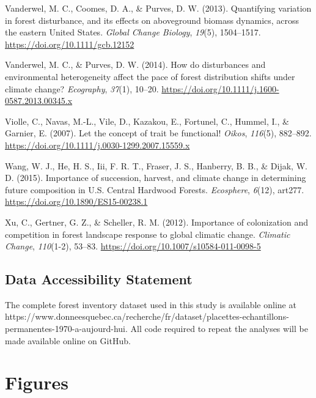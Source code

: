 \documentclass[
  a4paperpaper,
]{article}
\begin{document}
\leavevmode\hypertarget{ref-vanderwel_quantifying_2013}{}%
Vanderwel, M. C., Coomes, D. A., \& Purves, D. W. (2013). Quantifying
variation in forest disturbance, and its effects on aboveground biomass
dynamics, across the eastern United States. \emph{Global Change
Biology}, \emph{19}(5), 1504--1517.
\url{https://doi.org/10.1111/gcb.12152}

\leavevmode\hypertarget{ref-vanderwel_how_2014}{}%
Vanderwel, M. C., \& Purves, D. W. (2014). How do disturbances and
environmental heterogeneity affect the pace of forest distribution
shifts under climate change? \emph{Ecography}, \emph{37}(1), 10--20.
\url{https://doi.org/10.1111/j.1600-0587.2013.00345.x}

\leavevmode\hypertarget{ref-violle_let_2007}{}%
Violle, C., Navas, M.-L., Vile, D., Kazakou, E., Fortunel, C., Hummel,
I., \& Garnier, E. (2007). Let the concept of trait be functional!
\emph{Oikos}, \emph{116}(5), 882--892.
\url{https://doi.org/10.1111/j.0030-1299.2007.15559.x}

\leavevmode\hypertarget{ref-wang_importance_2015}{}%
Wang, W. J., He, H. S., Iii, F. R. T., Fraser, J. S., Hanberry, B. B.,
\& Dijak, W. D. (2015). Importance of succession, harvest, and climate
change in determining future composition in U.S. Central Hardwood
Forests. \emph{Ecosphere}, \emph{6}(12), art277.
\url{https://doi.org/10.1890/ES15-00238.1}

\leavevmode\hypertarget{ref-xu_importance_2012}{}%
Xu, C., Gertner, G. Z., \& Scheller, R. M. (2012). Importance of
colonization and competition in forest landscape response to global
climatic change. \emph{Climatic Change}, \emph{110}(1-2), 53--83.
\url{https://doi.org/10.1007/s10584-011-0098-5}

\pagebreak

\hypertarget{data-accessibility-statement}{%
\subsection{Data Accessibility
Statement}\label{data-accessibility-statement}}

The complete forest inventory dataset used in this study is available
online at
https://www.donneesquebec.ca/recherche/fr/dataset/placettes-echantillons-permanentes-1970-a-aujourd-hui.
All code required to repeat the analyses will be made available online
on GitHub.

\pagebreak

\hypertarget{figures}{%
\section{Figures}\label{figures}}

\pagebreak
\end{document}
